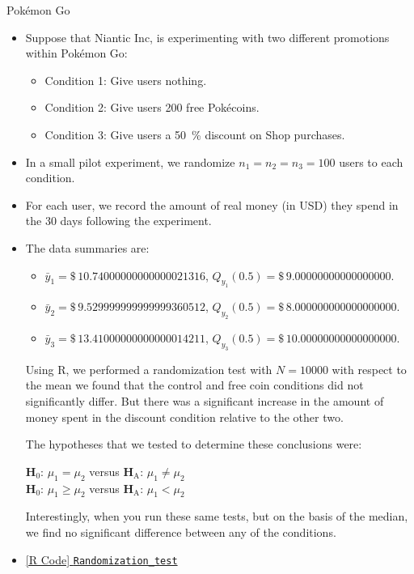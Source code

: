 \begin{Example}{Pokémon Go}{}
      \begin{itemize}
            \item Suppose that Niantic Inc, is experimenting with two different promotions within Pokémon
                  Go:
                  \begin{itemize}
                        \item Condition 1: Give users nothing.
                        \item Condition 2: Give users 200 free Pokécoins.
                        \item Condition 3: Give users a \qty{50}{\percent} discount on Shop purchases.
                  \end{itemize}
            \item In a small pilot experiment, we randomize $ n_1=n_2=n_3=100 $ users to each condition.
            \item For each user, we record the amount of real money (in USD) they spend in the 30 days
                  following the experiment.
            \item The data summaries are:
                  \begin{itemize}
                        \item $ \bar{y}_1=\$\,\num{10.74000000000000021316} $, $ Q_{y_1}(0.5)=\$\,\num{9.00000000000000000} $.
                        \item $ \bar{y}_2=\$\,\num{9.529999999999999360512} $, $ Q_{y_2}(0.5)=\$\,\num{8.000000000000000000} $.
                        \item $ \bar{y}_3=\$\,\num{13.41000000000000014211} $, $ Q_{y_3}(0.5)=\$\,\num{10.00000000000000000} $.
                  \end{itemize}
                  Using R, we performed a randomization test with $ N=\num{10000} $ with respect to the mean
                  we found that the control and free coin conditions did not significantly differ.
                  But there was a significant increase in the amount of money spent in the discount condition
                  relative to the other two.

                  \vspace{2mm}

                  The hypotheses that we tested to determine these conclusions were:
                  \begin{tightcenter}
                        $ \mathbf{H}_0 $: $ \mu_1=\mu_2 $ versus $ \mathbf{H}_\text{A} $: $ \mu_1\ne \mu_2 $\\
                        $ \mathbf{H}_0 $: $ \mu_1\ge \mu_2 $ versus $ \mathbf{H}_\text{A} $: $ \mu_1<\mu_2 $
                  \end{tightcenter}
                  Interestingly, when you run these same tests, but on the basis of the median, we find
                  no significant difference between any of the conditions.
            \item \href{https://github.com/Hextical/university-notes/blob/master/year-3/semester-3/STAT 430/code/W3/Randomization_test.R}{[R Code] \texttt{Randomization\_test}}
      \end{itemize}
\end{Example}
